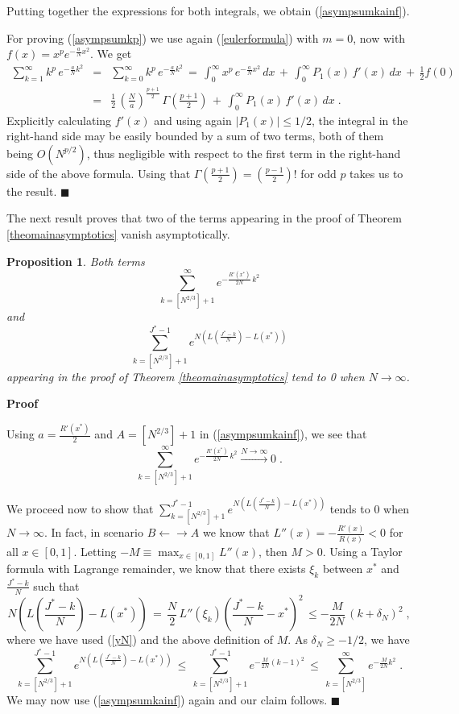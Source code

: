 \documentclass[12pt]{article}
\newtheorem{proposition}{Proposition}
\begin{document}
Putting together the expressions for both integrals, we obtain (\ref{asympsumkainf}).

For proving (\ref{asympsumkp}) we use again (\ref{eulerformula}) with $m=0$, now with $f(x)=x^p e^{-\frac{a}{N} x^2}$. We get
\begin{eqnarray}
\sum_{k=1}^{\infty} k^p \, e^{-\frac{a}{N}k^2} &=& \sum_{k=0}^{\infty} k^p \, e^{-\frac{a}{N}k^2} \,=\, \int_0^{\infty} x^p \, e^{-\frac{a}{N} x^2} \, dx \,+\, \int_0^{\infty} P_1(x)\, f'(x) \, dx \,+\, \frac{1}{2}f(0)\nonumber\\
&=& \frac{1}{2} \, \left(\frac{N}{a}\right)^{\frac{p+1}{2}}\, \Gamma(\frac{p+1}{2})\,+\, \int_0^{\infty} P_1(x)\, f'(x) \, dx\;. \nonumber
\end{eqnarray}
Explicitly calculating $f'(x)$ and using again $|P_1(x)|\leq 1/2$, the integral in the right-hand side may be easily bounded by a sum of two terms, both of them being $O(N^{p/2})$, thus negligible with respect to the first term in the right-hand side of the above formula. Using that $\Gamma(\frac{p+1}{2})= (\frac{p-1}{2})!$ for odd $p$ takes us to the result.
$\blacksquare$

The next result proves that two of the terms appearing in the proof of Theorem \ref{theomainasymptotics} vanish asymptotically.
\begin{proposition}  \label{n23}
Both terms
	\[\sum_{k=[ N^{2/3}]+1}^{\infty} e^{-\frac{R'(x^{\ast})}{2N} \, k^2}\]
	and 
	\[
	\sum_{k=[ N^{2/3}]+1}^{J^{\ast}-1} e^{N(L(\frac{J^{\ast}-k}{N})-L(x^{\ast}))}
	\]
	appearing in the proof of Theorem \ref{theomainasymptotics} tend to 0 when $N \rightarrow \infty$.
\end{proposition}

\textbf{Proof}


Using $a=\frac{R'(x^{\ast})}{2}$ and $A= [ N^{2/3}]+1$ in (\ref{asympsumkainf}), we see that 
	\[\sum_{k=[ N^{2/3}]+1}^{\infty} e^{-\frac{R'(x^{\ast})}{2N} \, k^2} \stackrel{N \rightarrow \infty}{\rightarrow} 0\;. \]
	
We proceed now to show that $\sum_{k=[ N^{2/3}]+1}^{J^{\ast}-1} e^{N(L(\frac{J^{\ast}-k}{N})-L(x^{\ast}))}$  tends to 0 when $N \rightarrow \infty$. In fact, in scenario $B\leftarrow \rightarrow A$ we know that $L''(x)=-\frac{R'(x)}{R(x)} <0$ for all $x \in[0,1]$. Letting $-M \equiv \max_{x\in[0,1]} L''(x)$, then $M>0$. Using a Taylor formula with Lagrange remainder, we know that there exists $\xi_k$ between $x^{\ast}$ and $\frac{J^{\ast}-k}{N}$ such that
\[N(L(\frac{J^{\ast}-k}{N})-L(x^{\ast})) \,=\, \frac{N}{2} \, L''(\xi_k) \left(\frac{J^{\ast}-k}{N}-x^{\ast}\right)^2 \, \leq -\frac{M}{2N} \,(k+\delta_N)^2 \;,\]
where we have used (\ref{yN}) and the above definition of $M$. As $\delta_N \geq -1/2$, we have
\[\sum_{k=[ N^{2/3}]+1}^{J^{\ast}-1} e^{N(L(\frac{J^{\ast}-k}{N})-L(x^{\ast}))} \,\leq \, \sum_{k=[ N^{2/3}]+1}^{J^{\ast}-1} e^{-\frac{M}{2N}(k-1)^2} \,\leq\, \sum_{k=[ N^{2/3}]}^{\infty} e^{-\frac{M}{2N}k^2}\;.\]
We may now use (\ref{asympsumkainf}) again and our claim follows.
$\blacksquare$
\end{document}
